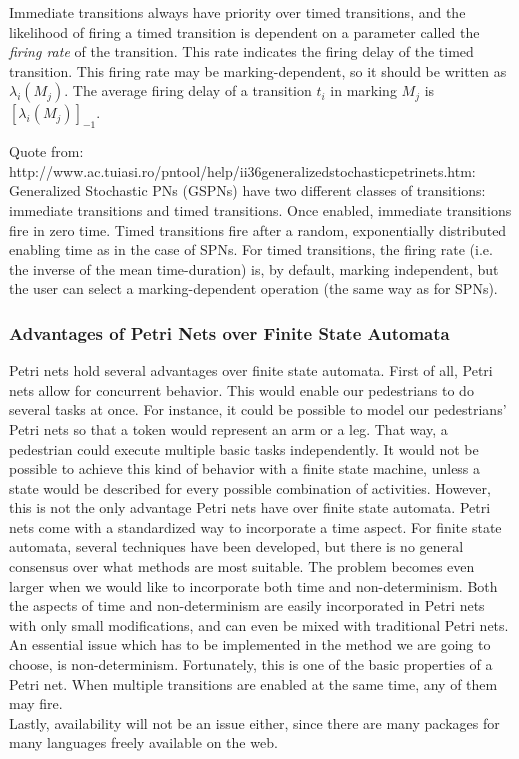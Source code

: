 \documentclass[11pt]{article}
\begin{document}
Immediate transitions always have priority over timed transitions, and  the likelihood of firing a timed transition is dependent on a parameter called the \emph{firing rate} of the transition. This rate indicates the firing delay of the timed transition. This firing rate may be marking-dependent, so it should be written as $\lambda_i(M_j)$.  The average firing delay of a transition $t_i$ in marking $M_j$ is $[\lambda_i(M_j)]_{-1}$.



Quote from: http://www.ac.tuiasi.ro/pntool/help/ii36generalizedstochasticpetrinets.htm:
Generalized Stochastic PNs (GSPNs) have two different classes of transitions: immediate transitions and timed transitions. Once enabled, immediate transitions fire in zero time. Timed transitions fire after a random, exponentially distributed enabling time as in the case of SPNs. For timed transitions, the firing rate (i.e. the inverse of the mean time-duration) is, by default, marking independent, but the user can select a marking-dependent operation (the same way as for SPNs).

\subsubsection{Advantages of Petri Nets over Finite State Automata}
Petri nets hold several advantages over finite state automata. First of all, Petri nets allow for concurrent behavior. This would enable our pedestrians to do several tasks at once. For instance, it could be possible to model our pedestrians' Petri nets so that a token would represent an arm or a leg. That way, a pedestrian could execute multiple basic tasks independently. It would not be possible to achieve this kind of behavior with a finite state machine, unless a state would be described for every possible combination of activities.
However, this is not the only advantage Petri nets have over finite state automata. Petri nets come with a standardized way to incorporate a time aspect. For finite state automata, several techniques have been developed, but there is no general consensus over what methods are most suitable. The problem becomes even larger when we would like to incorporate both time and non-determinism. Both the aspects of time and non-determinism are easily incorporated in Petri nets with only small modifications, and can even be mixed with traditional Petri nets.
An essential issue which has to be implemented in the method we are going to choose, is non-determinism. Fortunately, this is one of the basic properties of a Petri net. When multiple transitions are enabled at the same time, any of them may fire.\\
Lastly, availability will not be an issue either, since there are many packages for many languages freely available on the web.
\end{document}
